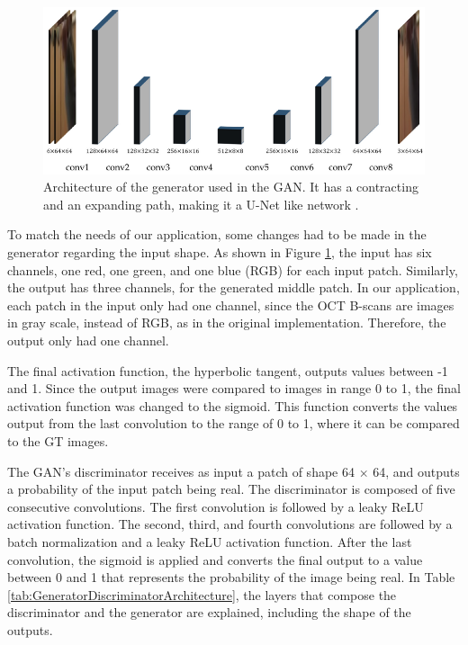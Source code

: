 \begin{figure}
	\centering
	\includegraphics[width=1.0\linewidth]{figures/GeneratorArchitecture}
	\caption{Architecture of the generator used in the GAN. It has a contracting and an expanding path, making it a U-Net like network \parencite{Tran2020}.}
	\label{fig:GeneratorArchitecture}
\end{figure}


To match the needs of our application, some changes had to be made in the generator regarding the input shape. As shown in Figure \ref{fig:GeneratorArchitecture}, the input has six channels, one red, one green, and one blue (RGB) for each input patch. Similarly, the output has three channels, for the generated middle patch. In our application, each patch in the input only had one channel, since the OCT B-scans are images in gray scale, instead of RGB, as in the original implementation. Therefore, the output only had one channel. 
\par
The final activation function, the hyperbolic tangent, outputs values between -1 and 1. Since the output images were compared to images in range 0 to 1, the final activation function was changed to the sigmoid. This function converts the values output from the last convolution to the range of 0 to 1, where it can be compared to the GT images.
\par
The GAN's discriminator receives as input a patch of shape 64 $\times$ 64, and outputs a probability of the input patch being real. The discriminator is composed of five consecutive convolutions. The first convolution is followed by a leaky ReLU activation function. The second, third, and fourth convolutions are followed by a batch normalization and a leaky ReLU activation function. After the last convolution, the sigmoid is applied and converts the final output to a value between 0 and 1 that represents the probability of the image being real. In Table \ref{tab:GeneratorDiscriminatorArchitecture}, the layers that compose the discriminator and the generator are explained, including the shape of the outputs.

